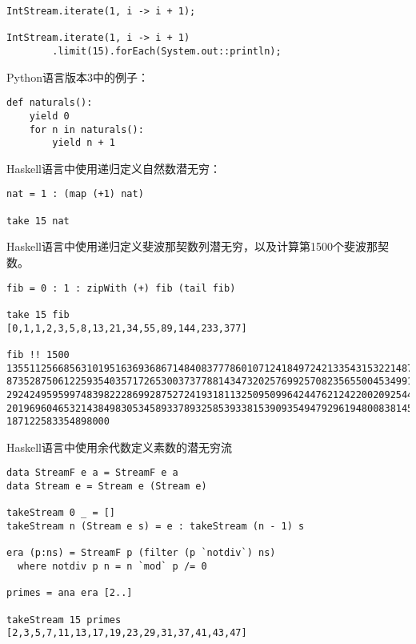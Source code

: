 \documentclass{article}
\begin{document}
\lstset{frame=single, language=Java}
\begin{lstlisting}
IntStream.iterate(1, i -> i + 1);

IntStream.iterate(1, i -> i + 1)
        .limit(15).forEach(System.out::println);
\end{lstlisting}

Python语言版本3中的例子：

\lstset{frame=single, language=Python}
\begin{lstlisting}
def naturals():
    yield 0
    for n in naturals():
        yield n + 1
\end{lstlisting}

Haskell语言中使用递归定义自然数潜无穷：

\lstset{frame=single, language=Haskell}
\begin{lstlisting}
nat = 1 : (map (+1) nat)

take 15 nat
\end{lstlisting}

Haskell语言中使用递归定义斐波那契数列潜无穷，以及计算第1500个斐波那契数。

\lstset{frame=single, language=Haskell}
\begin{lstlisting}
fib = 0 : 1 : zipWith (+) fib (tail fib)

take 15 fib
[0,1,1,2,3,5,8,13,21,34,55,89,144,233,377]

fib !! 1500
13551125668563101951636936867148408377786010712418497242133543153221487310
87352875061225935403571726530037377881434732025769925708235655004534991410
29242495959974839822286992875272419318113250950996424476212422002092544399
20196960465321438498305345893378932585393381539093549479296194800838145996
187122583354898000
\end{lstlisting}

Haskell语言中使用余代数定义素数的潜无穷流

\lstset{frame=single, language=Haskell}
\begin{lstlisting}
data StreamF e a = StreamF e a
data Stream e = Stream e (Stream e)

takeStream 0 _ = []
takeStream n (Stream e s) = e : takeStream (n - 1) s

era (p:ns) = StreamF p (filter (p `notdiv`) ns)
  where notdiv p n = n `mod` p /= 0

primes = ana era [2..]

takeStream 15 primes
[2,3,5,7,11,13,17,19,23,29,31,37,41,43,47]
\end{lstlisting}
\end{document}
